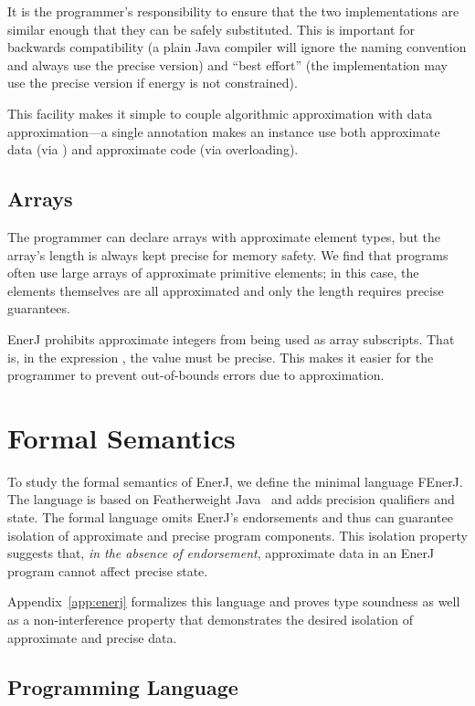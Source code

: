 It is the programmer's responsibility to ensure that the two
implementations are similar enough that they can be safely substituted.
This is important for backwards compatibility
(a plain Java compiler will ignore the naming convention and always
use the precise version) and ``best effort'' (the implementation may
use the precise version if energy is not constrained).

This facility makes it simple to couple algorithmic approximation with
data approximation---a single annotation makes an instance use both
approximate data (via ) and approximate code (via
overloading).

\subsection{Arrays}
The programmer can declare arrays with approximate element types, but
the array's length is always kept precise for memory safety.
We find that programs often
use large arrays of approximate primitive elements; in this case, the
elements themselves are all approximated and only the length requires
precise guarantees.

EnerJ prohibits approximate integers from being used as array
subscripts. That is, in the expression , the value  must
be precise. This makes it easier for the programmer to
prevent out-of-bounds errors due to approximation.

\section{Formal Semantics}
\label{enerj:semantics}
To study the formal semantics of EnerJ, we define the minimal language
FEnerJ. The language is based on Featherweight Java~\cite{fjava}
and adds precision qualifiers and state. The formal language omits
EnerJ's endorsements and thus can guarantee isolation of approximate and
precise program components. This isolation property suggests that,
\emph{in the absence of endorsement}, approximate data in an EnerJ program
cannot affect precise state.

Appendix~\ref{app:enerj} formalizes this language and
proves type soundness as well as a non-interference
property that demonstrates the desired isolation of approximate and
precise data.


\subsection{Programming Language}


